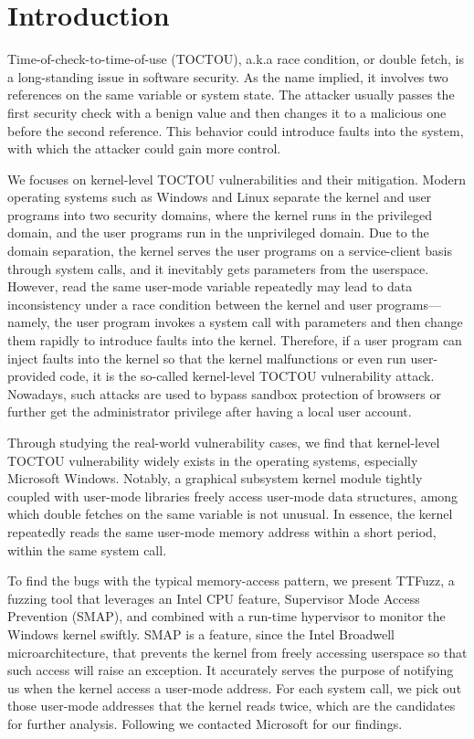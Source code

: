 
\section{Introduction}
\label{sec:ktoctou-introduction}


Time-of-check-to-time-of-use (TOCTOU), a.k.a race condition, or double fetch, is a long-standing issue in software security. As the name implied, it involves two references on the same variable or system state. The attacker usually passes the first security check with a benign value and then changes it to a malicious one before the second reference. This behavior could introduce faults into the system, with which the attacker could gain more control.

We focuses on kernel-level TOCTOU vulnerabilities and their mitigation. Modern operating systems such as Windows and Linux separate the kernel and user programs into two security domains,  where the kernel runs in the privileged domain, and the user programs run in the unprivileged domain. Due to the domain separation, the kernel serves the user programs on a service-client basis through system calls, and it inevitably gets parameters from the userspace. However, read the same user-mode variable repeatedly may lead to data inconsistency under a race condition between the kernel and user programs---namely, the user program invokes a system call with parameters and then change them rapidly to introduce faults into the kernel. Therefore, if a user program can inject faults into the kernel so that the kernel malfunctions or even run user-provided code, it is the so-called kernel-level TOCTOU vulnerability attack.  Nowadays, such attacks are used to bypass sandbox protection of browsers or further get the administrator privilege after having a local user account.

Through studying the real-world vulnerability cases,  we find that kernel-level TOCTOU vulnerability widely exists in the operating systems, especially Microsoft Windows. Notably, a graphical subsystem kernel module tightly coupled with user-mode libraries freely access user-mode data structures, among which double fetches on the same variable is not unusual. In essence, the kernel repeatedly reads the same user-mode memory address within a short period, within the same system call.

To find the bugs with the typical memory-access pattern, we present TTFuzz, a fuzzing tool that leverages an Intel CPU feature, Supervisor Mode Access Prevention (SMAP), and combined with a run-time hypervisor to monitor the Windows kernel swiftly. SMAP is a feature, since the Intel Broadwell microarchitecture, that prevents the kernel from freely accessing userspace so that such access will raise an exception. It accurately serves the purpose of notifying us when the kernel access a user-mode address. For each system call, we pick out those user-mode addresses that the kernel reads twice, which are the candidates for further analysis. Following we contacted Microsoft for our findings.

